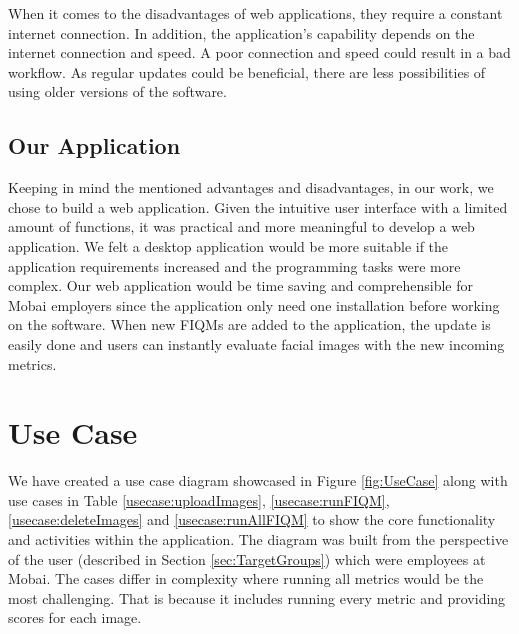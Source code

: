 When it comes to the disadvantages of web applications, they require a constant internet connection. In addition, the application's capability depends on the internet connection and speed. A poor connection and speed could result in a bad workflow. As regular updates could be beneficial, there are less possibilities of using older versions of the software. 

\subsection*{Our Application}
Keeping in mind the mentioned advantages and disadvantages, in our work, we chose to build a web application. Given the intuitive user interface with a limited amount of functions, it was practical and more meaningful to develop a web application. We felt a desktop application would be more suitable if the application requirements increased and the programming tasks were more complex. Our web application would be time saving and comprehensible for Mobai employers since the application only need one installation before working on the software. When new FIQMs are added to the application, the update is easily done and users can instantly evaluate facial images with the new incoming metrics. 

\section{Use Case}
\label{sec:useCase}
We have created a use case diagram  showcased in Figure \ref{fig:UseCase} along with use cases in Table \ref{usecase:uploadImages}, \ref{usecase:runFIQM}, \ref{usecase:deleteImages} and \ref{usecase:runAllFIQM} to show the core functionality and activities within the application. The diagram was built from the perspective of the user (described in Section \ref{sec:TargetGroups}) which were employees at Mobai. The cases differ in complexity where running all metrics would be the most challenging. That is because it includes running every metric and providing scores for each image. 

